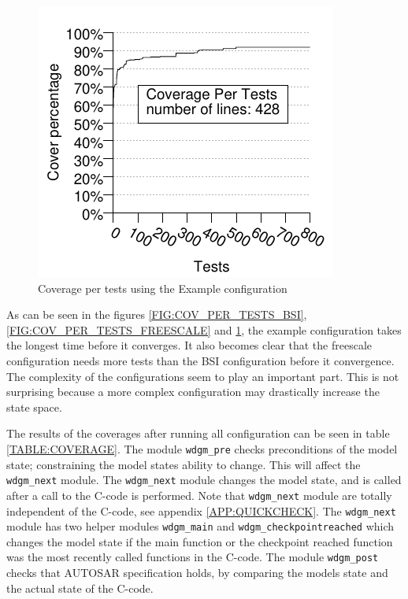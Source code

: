 \begin{figure}[!ht]
\begin{center}
\includegraphics{generated_pictures/coverage_per_tests_example.pdf}
\end{center}
\caption{Coverage per tests using the Example configuration}
\label{FIG:COV_PER_TESTS_EXAMPLE}
\end{figure}

As can be seen in the figures \ref{FIG:COV_PER_TESTS_BSI},
\ref{FIG:COV_PER_TESTS_FREESCALE} and \ref{FIG:COV_PER_TESTS_EXAMPLE},
the example configuration takes the longest time before it
converges. It also becomes clear that the freescale configuration
needs more tests than the BSI configuration before it convergence. The
complexity of the configurations seem to play an important
part. This is not surprising because a more complex configuration may
drastically increase the state space.

The results of the coverages after running all configuration can be
seen in table \ref{TABLE:COVERAGE}. The module \lstinline!wdgm_pre!
checks preconditions of the model state; constraining the model states
ability to change. This will affect the \lstinline!wdgm_next!
module. The \lstinline!wdgm_next! module changes the model state, and
is called after a call to the C-code is performed. Note that
\lstinline!wdgm_next! module are totally independent of the C-code,
see appendix \ref{APP:QUICKCHECK}. The \lstinline!wdgm_next! module
has two helper modules \lstinline!wdgm_main! and
\lstinline!wdgm_checkpointreached! which changes the model state if
the main function or the checkpoint reached function was the most
recently called functions in the C-code. The module
\lstinline!wdgm_post! checks that AUTOSAR specification holds, by
comparing the models state and the actual state of the C-code.

